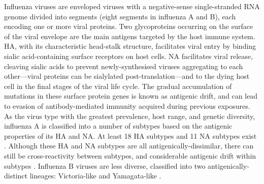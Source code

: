 Influenza viruses are enveloped viruses with a negative-sense single-stranded RNA genome divided into segments (eight segments in influenza A and B), each encoding one or more viral proteins.
Two glycoproteins occurring on the surface of the viral envelope are the main antigens targeted by the host immune system.
\Gls{HA}, with its characteristic head-stalk structure, facilitates viral entry by binding sialic acid-containing surface receptors on host cells.
\Gls{NA} facilitates viral release, cleaving sialic acids to prevent newly-synthesised viruses aggregating to each other---viral proteins can be sialylated post-translation---and to the dying host cell in the final stages of the viral life cycle.
The gradual accumulation of mutations in these surface protein genes is known as antigenic drift,
and can lead to evasion of antibody-mediated immunity acquired during previous exposures.
As the virus type with the greatest prevalence, host range, and genetic diversity,
influenza A is classified into a number of subtypes based on the antigenic properties of its \gls{HA} and \gls{NA}.
At least 18 \gls{HA} subtypes and 11 \gls{NA} subtypes exist \autocite{krammer2019HumanAntibodyResponse}.
Although these \gls{HA} and \gls{NA} subtypes are all antigenically-dissimilar, 
there can still be cross-reactivity between subtypes, and considerable antigenic drift within subtypes \autocite{worldhealthorganization1980RevisionSystemNomenclature}.
%
%
Influenza B viruses are less diverse, classified into two antigenically-distinct lineages: Victoria-like and Yamagata-like \autocite{krammer2018Influenza}.

